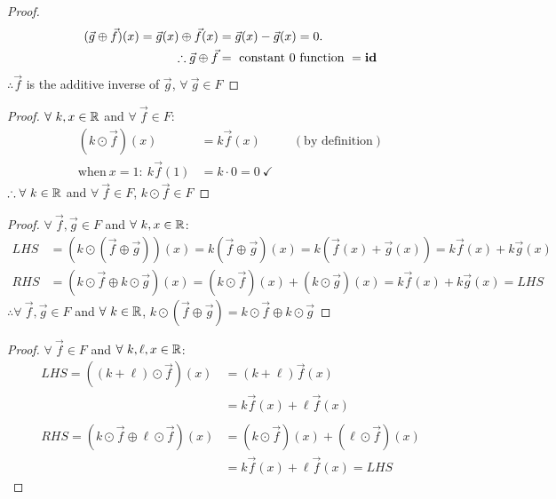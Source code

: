 \begin{enumerate}
\begin{proof}
\begin{align*}
      (\vec{g} \oplus \vec{f})(x) = \vec{g}(x) \oplus \vec{f}(x) & = \vec{g}(x) - \vec{g}(x)= 0.             \\
      \therefore \vec{g} \oplus \vec{f}                          & = ~\text{constant 0 function}~ = \textbf{id}
    \end{align*}
    $\therefore \vec{f}$ is the additive inverse of $\vec{g}$, $\forall~\vec{g} \in F$
  \end{proof}
  \begin{proof}
    $\forall~k,x \in \mathbb{R}$ and $\forall~\vec{f} \in F$:
    \begin{align*}
      (k \odot \vec{f})(x)         & = k\vec{f}(x)              &  & (\text{by definition}) \\
      \text{when}~x=1:~k\vec{f}(1) & = k \cdot 0 = 0~\checkmark
    \end{align*}
    $\therefore \forall~k \in \mathbb{R}$ and $\forall~\vec{f} \in F$, $k\odot\vec{f} \in F$
  \end{proof}
  \begin{proof}
    $\forall~\vec{f},\vec{g} \in F$ and $\forall~k, x \in \mathbb{R}$:
    \begin{align*}
      LHS & = (k \odot (\vec{f} \oplus \vec{g}))(x) = k(\vec{f} \oplus \vec{g})(x) = k(\vec{f}(x) + \vec{g}(x)) = k\vec{f}(x) + k\vec{g}(x) \\
      RHS & = (k \odot \vec{f} \oplus k \odot \vec{g})(x) = (k \odot \vec{f})(x) + (k \odot \vec{g})(x) = k\vec{f}(x) + k\vec{g}(x) = LHS
    \end{align*}
    $\therefore \forall~\vec{f},\vec{g} \in F$ and $\forall~k \in \mathbb{R}$, $k \odot (\vec{f} \oplus \vec{g}) = k \odot \vec{f} \oplus k \odot \vec{g}$
  \end{proof}
  \begin{proof}
    $\forall~\vec{f} \in F$ and $\forall~k, \ell, x \in \mathbb{R}$:
    \begin{align*}
      LHS = ((k + \ell) \odot \vec{f})(x)                  & = (k+\ell)\vec{f}(x)                             \\
                                                           & = k\vec{f}(x) + \ell\vec{f}(x)                   \\ \\
      RHS = (k \odot \vec{f} \oplus \ell \odot \vec{f})(x) & = (k \odot \vec{f})(x) + (\ell \odot \vec{f})(x) \\
                                                           & = k\vec{f}(x) + \ell\vec{f}(x) = LHS

\end{align*}
\end{proof}
\end{enumerate}
